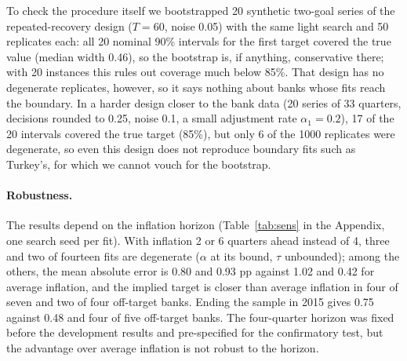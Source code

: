\documentclass[pdflatex,sn-basic]{sn-jnl}
\theoremstyle{thmstyleone}\newtheorem{proposition}{Proposition}\newtheorem{theorem}{Theorem}
\theoremstyle{thmstylethree}\newtheorem{remark}{Remark}
\begin{document}
To check the procedure itself we bootstrapped 20 synthetic two-goal series of the repeated-recovery design ($T=60$, noise 0.05) with the same light search and 50 replicates each: all 20 nominal 90\% intervals for the first target covered the true value (median width 0.46), so the bootstrap is, if anything, conservative there; with 20 instances this rules out coverage much below 85\%. That design has no degenerate replicates, however, so it says nothing about banks whose fits reach the boundary. In a harder design closer to the bank data (20 series of 33 quarters, decisions rounded to 0.25, noise 0.1, a small adjustment rate $\alpha_1=0.2$), 17 of the 20 intervals covered the true target (85\%), but only 6 of the 1000 replicates were degenerate, so even this design does not reproduce boundary fits such as Turkey's, for which we cannot vouch for the bootstrap.
\begin{table}[t]\centering\small
\caption{Moving-block bootstrap of the implied inflation target (200 replicates, blocks of 8 quarters, lighter search). $\hat\tau$ (full): reported estimate; $\hat\tau$ (light): estimate of the lighter search used in the replicates. Quantiles over all replicates; replicates with $\alpha$ at its lower bound ($\tau$ unbounded) are placed at $\pm\infty$, and an end they reach is shown as unbounded.}\label{tab:boot}\end{table}


\paragraph{Robustness.} The results depend on the inflation horizon (Table~\ref{tab:sens} in the Appendix, one search seed per fit). With inflation 2 or 6 quarters ahead instead of 4, three and two of fourteen fits are degenerate ($\alpha$ at its bound, $\tau$ unbounded); among the others, the mean absolute error is 0.80 and 0.93 pp against 1.02 and 0.42 for average inflation, and the implied target is closer than average inflation in four of seven and two of four off-target banks. Ending the sample in 2015 gives 0.75 against 0.48 and four of five off-target banks. The four-quarter horizon was fixed before the development results and pre-specified for the confirmatory test, but the advantage over average inflation is not robust to the horizon.
\end{document}
